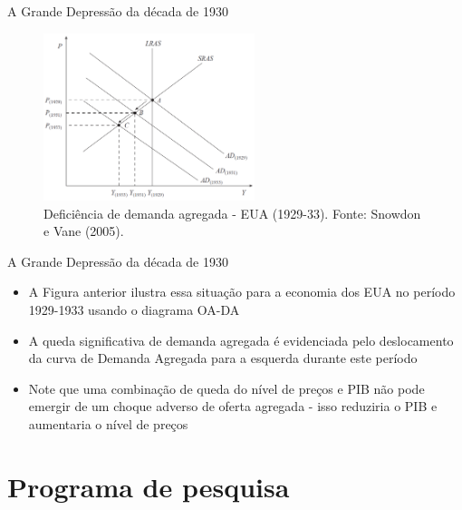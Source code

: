 \documentclass[10pt]{beamer}
\begin{document}
\begin{frame}{A Grande Depressão da década de 1930}
    \begin{figure}
        \centering
        \includegraphics[width=0.55\textwidth]{./figures/aula4_fig2}
        \caption{Deficiência de demanda agregada - EUA (1929-33). Fonte: Snowdon e Vane (2005).}
        \label{fig2}
    \end{figure}
\end{frame}

\begin{frame}{A Grande Depressão da década de 1930}
    \begin{itemize}
        \item A Figura anterior ilustra essa situação para a economia dos EUA no período 1929-1933 usando o diagrama OA-DA
        \bigskip
        \item A queda significativa de demanda agregada é evidenciada pelo deslocamento da curva de Demanda Agregada para a esquerda durante este período
        \bigskip
        \item Note que uma combinação de queda do nível de preços e PIB não pode emergir de um choque adverso de oferta agregada - isso reduziria o PIB e aumentaria o nível de preços
    \end{itemize}
\end{frame}

\section{Programa de pesquisa}
\end{document}
